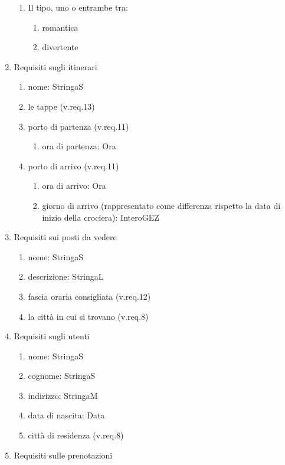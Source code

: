\documentclass{article}
\begin{document}
\begin{enumerate}
\begin{enumerate}
        \item Il tipo, uno o entrambe tra:
        \begin{enumerate}
            \item romantica
            \item divertente
        \end{enumerate}
    \end{enumerate}
    \item Requisiti sugli itinerari
    \begin{enumerate}
        \item nome: StringaS
        \item le tappe (v.req.13)
        \item porto di partenza (v.req.11)
        \begin{enumerate}
            \item ora di partenza: Ora
        \end{enumerate}
        \item porto di arrivo (v.req.11)
        \begin{enumerate}
            \item ora di arrivo: Ora
            \item giorno di arrivo (rappresentato come differenza rispetto la data di inizio della crociera): InteroGEZ
        \end{enumerate}
    \end{enumerate}
    \item Requisiti sui posti da vedere
    \begin{enumerate}
        \item nome: StringaS
        \item descrizione: StringaL
        \item fascia oraria consigliata (v.req.12)
        \item la città in cui si trovano (v.req.8)
    \end{enumerate}
    \item Requisiti sugli utenti
    \begin{enumerate}
        \item nome: StringaS
        \item cognome: StringaS
        \item indirizzo: StringaM
        \item data di nascita: Data
        \item città di residenza (v.req.8)
    \end{enumerate}
    \item Requisiti sulle prenotazioni

\end{enumerate}
\end{document}
